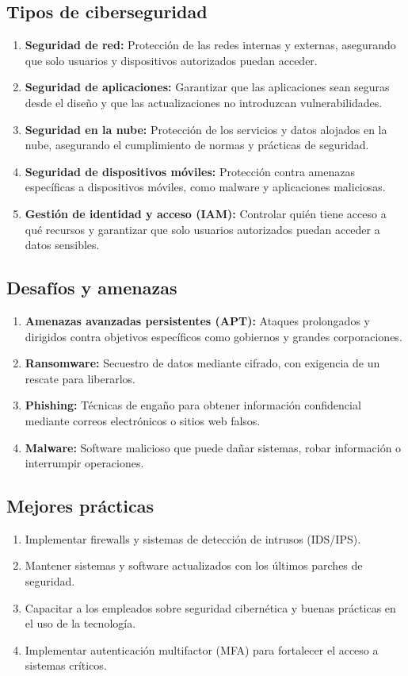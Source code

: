 \documentclass{article}
\begin{document}
\subsection{Tipos de ciberseguridad}
\begin{enumerate}
    \item \textbf{Seguridad de red:} Protección de las redes internas y externas, asegurando que solo usuarios y dispositivos autorizados puedan acceder.
    \item \textbf{Seguridad de aplicaciones:} Garantizar que las aplicaciones sean seguras desde el diseño y que las actualizaciones no introduzcan vulnerabilidades.
    \item \textbf{Seguridad en la nube:} Protección de los servicios y datos alojados en la nube, asegurando el cumplimiento de normas y prácticas de seguridad.
    \item \textbf{Seguridad de dispositivos móviles:} Protección contra amenazas específicas a dispositivos móviles, como malware y aplicaciones maliciosas.
    \item \textbf{Gestión de identidad y acceso (IAM):} Controlar quién tiene acceso a qué recursos y garantizar que solo usuarios autorizados puedan acceder a datos sensibles.
\end{enumerate}

\subsection{Desafíos y amenazas}
\begin{enumerate}
    \item \textbf{Amenazas avanzadas persistentes (APT):} Ataques prolongados y dirigidos contra objetivos específicos como gobiernos y grandes corporaciones.
    \item \textbf{Ransomware:} Secuestro de datos mediante cifrado, con exigencia de un rescate para liberarlos.
    \item \textbf{Phishing:} Técnicas de engaño para obtener información confidencial mediante correos electrónicos o sitios web falsos.
    \item \textbf{Malware:} Software malicioso que puede dañar sistemas, robar información o interrumpir operaciones.
\end{enumerate}

\subsection{Mejores prácticas}
\begin{enumerate}
    \item Implementar firewalls y sistemas de detección de intrusos (IDS/IPS).
    \item Mantener sistemas y software actualizados con los últimos parches de seguridad.
    \item Capacitar a los empleados sobre seguridad cibernética y buenas prácticas en el uso de la tecnología.
    \item Implementar autenticación multifactor (MFA) para fortalecer el acceso a sistemas críticos.
\end{enumerate}
\end{document}

